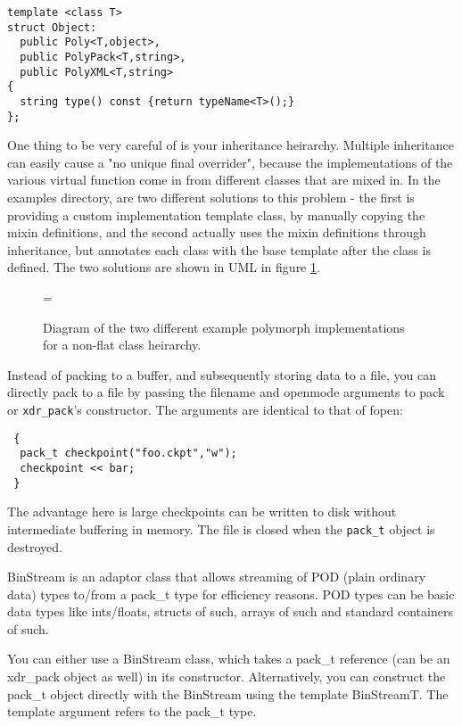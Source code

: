 \begin{verbatim}
template <class T>
struct Object: 
  public Poly<T,object>, 
  public PolyPack<T,string>, 
  public PolyXML<T,string> 
{
  string type() const {return typeName<T>();}
};
\end{verbatim}

One thing to be very careful of is your inheritance
heirarchy. Multiple inheritance can easily cause a "no unique final
overrider", because the implementations of the various virtual
function come in from different classes that are mixed in. In the
examples directory, are two different solutions to this problem - the
first is providing a custom implementation template class, by manually
copying the mixin definitions, and the second actually uses the mixin
definitions through inheritance, but annotates each class with the
base template after the class is defined. The two solutions are shown
in UML in figure \ref{polymorph-example}.

\begin{figure}
\epsfclipon\epsfxsize=\textwidth
{}
\caption{Diagram of the two different example polymorph
  implementations for a non-flat class heirarchy.}
\label{polymorph-example}
\end{figure}


Instead of packing to a buffer, and subsequently storing data to a
file, you can directly pack to a file by passing the filename and
openmode arguments to pack or \verb+xdr_pack+'s constructor. The arguments
are identical to that of fopen:
\begin{verbatim}
 {
  pack_t checkpoint("foo.ckpt","w");
  checkpoint << bar;
 } 
\end{verbatim}
The advantage here is large checkpoints can be written to disk without
intermediate buffering in memory. The file is closed when the \verb+pack_t+
object is destroyed.


BinStream is an adaptor class that allows streaming of POD (plain
ordinary data) types to/from a pack\_t type for efficiency reasons. POD
types can be basic data types like ints/floats, structs of such,
arrays of such and standard containers of such.

You can either use a BinStream class, which takes a pack\_t reference
(can be an xdr\_pack object as well) in its constructor. Alternatively,
you can construct the pack\_t object directly with the BinStream using
the template BinStreamT. The template argument refers to the pack\_t type.

